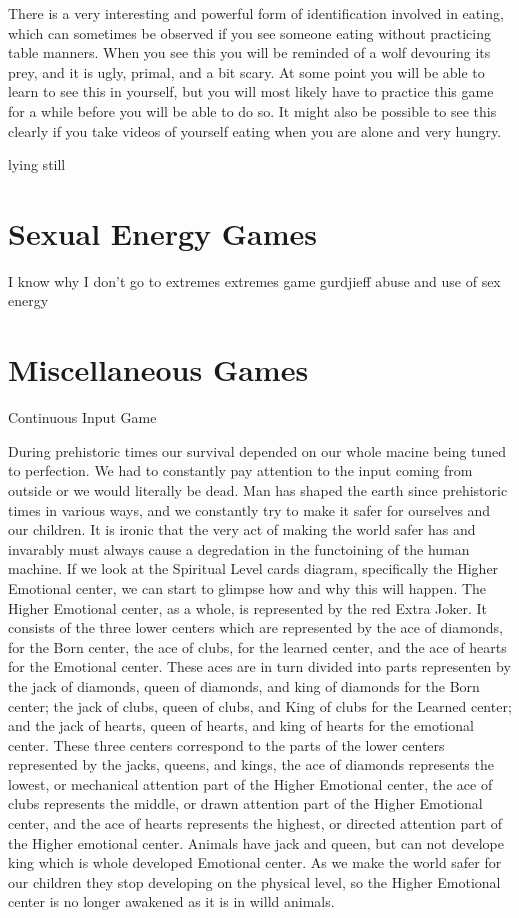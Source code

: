 \documentclass[12pt,letterpaper]{book}
\begin{document}
There is a very interesting and powerful form of identification involved in eating, which can sometimes be observed if you see someone eating without practicing table manners.
When you see this you will be reminded of a wolf devouring its prey, and it is ugly, primal, and a bit scary. At some point you will be able to learn to see this in yourself, but you will most likely have to practice this game for a while before you will be able to do so.
It might also be possible to see this clearly if you take videos of yourself eating when you are alone and very hungry.



lying still

\section{Sexual Energy Games}

I know why I don't go to extremes extremes game gurdjieff abuse and use of sex energy

\section{Miscellaneous Games}

Continuous Input Game

During prehistoric times our survival depended on our whole macine being tuned to perfection. We had to constantly pay attention to the input coming from outside or we would literally be dead. Man has shaped the earth since prehistoric times in various ways, and we constantly try to make it safer for ourselves and our children. It is ironic that the very act of making the world safer has and invarably must always cause a degredation in the functoining of the human machine. If we look at the Spiritual Level cards diagram, specifically the Higher Emotional center, we can start to glimpse how and why this will happen. The Higher Emotional center, as a whole, is represented by the red Extra Joker. It consists of the three lower centers which are represented by the ace of diamonds, for the Born center, the ace of clubs, for the learned center, and the ace of hearts for the Emotional center. These aces are in turn divided into parts representen by the jack of diamonds, queen of diamonds, and king of diamonds  for the Born center; the jack of clubs, queen of clubs, and King of clubs for the Learned center; and the jack of hearts, queen of hearts, and king of hearts for the emotional center. These three centers correspond to the parts of the lower centers represented by the jacks, queens, and kings, the ace of diamonds represents the lowest, or mechanical attention part of the Higher Emotional center, the ace of clubs represents the middle, or drawn attention part of the Higher Emotional center, and the ace of hearts represents the highest, or directed attention part of the Higher emotional center. Animals have jack and queen, but can not develope king which is whole developed Emotional center. As we make the world safer for our children they stop developing on the physical level, so the Higher Emotional center is no longer awakened as it is in willd animals. 
\end{document}
